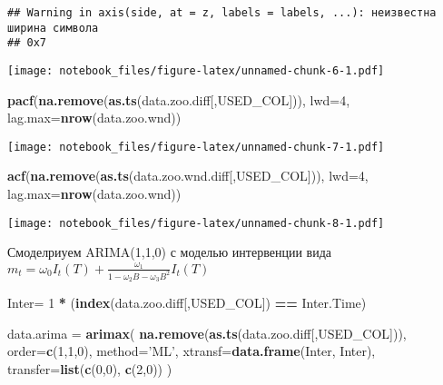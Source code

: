 \documentclass[
]{article}
\newenvironment{Shaded}{\begin{snugshade}}{\end{snugshade}}
\newcommand{\DataTypeTok}[1]{\textcolor[rgb]{0.13,0.29,0.53}{#1}}
\newcommand{\DecValTok}[1]{\textcolor[rgb]{0.00,0.00,0.81}{#1}}
\newcommand{\KeywordTok}[1]{\textcolor[rgb]{0.13,0.29,0.53}{\textbf{#1}}}
\newcommand{\NormalTok}[1]{#1}
\newcommand{\OperatorTok}[1]{\textcolor[rgb]{0.81,0.36,0.00}{\textbf{#1}}}
\newcommand{\StringTok}[1]{\textcolor[rgb]{0.31,0.60,0.02}{#1}}
\begin{document}
\begin{verbatim}
## Warning in axis(side, at = z, labels = labels, ...): неизвестна ширина символа
## 0x7
\end{verbatim}

\texttt{[image: notebook\_files/figure-latex/unnamed-chunk-6-1.pdf]}

\begin{Shaded}
\begin{Highlighting}[]
\KeywordTok{pacf}\NormalTok{(}\KeywordTok{na.remove}\NormalTok{(}\KeywordTok{as.ts}\NormalTok{(data.zoo.diff[,USED_COL])), }\DataTypeTok{lwd=}\DecValTok{4}\NormalTok{, }\DataTypeTok{lag.max=}\KeywordTok{nrow}\NormalTok{(data.zoo.wnd))}
\end{Highlighting}
\end{Shaded}

\texttt{[image: notebook\_files/figure-latex/unnamed-chunk-7-1.pdf]}

\begin{Shaded}
\begin{Highlighting}[]
\KeywordTok{acf}\NormalTok{(}\KeywordTok{na.remove}\NormalTok{(}\KeywordTok{as.ts}\NormalTok{(data.zoo.wnd.diff[,USED_COL])), }\DataTypeTok{lwd=}\DecValTok{4}\NormalTok{, }\DataTypeTok{lag.max=}\KeywordTok{nrow}\NormalTok{(data.zoo.wnd))}
\end{Highlighting}
\end{Shaded}

\texttt{[image: notebook\_files/figure-latex/unnamed-chunk-8-1.pdf]}

Смоделриуем ARIMA(1,1,0) с моделью интервенции вида
\(m_t = \omega_0I_t(T)+\frac{\omega_1}{1-\omega_2B-\omega_3B^2}I_t(T)\)

\begin{Shaded}
\begin{Highlighting}[]
\NormalTok{Inter=}\StringTok{ }\DecValTok{1} \OperatorTok{*}\StringTok{ }\NormalTok{(}\KeywordTok{index}\NormalTok{(data.zoo.diff[,USED_COL]) }\OperatorTok{==}\StringTok{ }\NormalTok{Inter.Time)}

\NormalTok{data.arima =}\StringTok{ }\KeywordTok{arimax}\NormalTok{(}
  \KeywordTok{na.remove}\NormalTok{(}\KeywordTok{as.ts}\NormalTok{(data.zoo.diff[,USED_COL])),}
  \DataTypeTok{order=}\KeywordTok{c}\NormalTok{(}\DecValTok{1}\NormalTok{,}\DecValTok{1}\NormalTok{,}\DecValTok{0}\NormalTok{),}
  \DataTypeTok{method=}\StringTok{'ML'}\NormalTok{,}
  \DataTypeTok{xtransf=}\KeywordTok{data.frame}\NormalTok{(Inter, Inter),}
  \DataTypeTok{transfer=}\KeywordTok{list}\NormalTok{(}\KeywordTok{c}\NormalTok{(}\DecValTok{0}\NormalTok{,}\DecValTok{0}\NormalTok{), }\KeywordTok{c}\NormalTok{(}\DecValTok{2}\NormalTok{,}\DecValTok{0}\NormalTok{))}
\NormalTok{)}
\end{Highlighting}
\end{Shaded}
\end{document}
